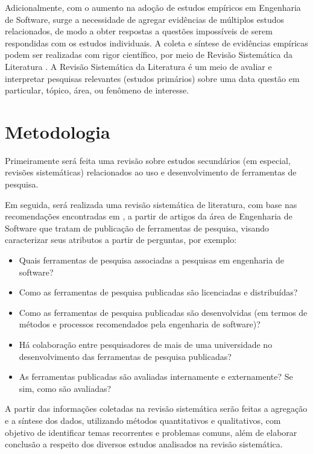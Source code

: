 \documentclass[12pt]{article}
\begin{document}
Adicionalmente, com o aumento na adoção de estudos empíricos em Engenharia de
Software, surge a necessidade de agregar evidências de múltiplos estudos
relacionados, de modo a obter respostas a questões impossíveis de serem
respondidas com os estudos individuais. A coleta e síntese de evidências
empíricas podem ser realizadas com rigor científico, por meio de Revisão
Sistemática da Literatura \cite{Kitchenham2007}. A Revisão Sistemática da
Literatura  é um meio de avaliar e interpretar pesquisas relevantes (estudos
primários) sobre uma data questão em particular, tópico, área, ou fenômeno de
interesse.

\section{Metodologia}

Primeiramente será feita uma revisão sobre estudos secundários (em especial,
revisões sistemáticas) relacionados ao uso e desenvolvimento de ferramentas de
pesquisa.
  
Em seguida, será realizada uma revisão sistemática de literatura, com base nas
recomendações encontradas em \cite{Kitchenham2007}, a partir
de artigos da área de Engenharia de Software que tratam de publicação de
ferramentas de pesquisa, visando caracterizar seus atributos a partir de
perguntas, por exemplo:

\begin{itemize}
  \item Quais ferramentas de pesquisa associadas a pesquisas em engenharia de
    software?
  \item Como as ferramentas de pesquisa publicadas são licenciadas e
    distribuídas?
  \item Como as ferramentas de pesquisa publicadas são desenvolvidas (em
    termos de métodos e processos recomendados pela engenharia de software)?
  \item Há colaboração entre pesquisadores de mais de uma universidade no
    desenvolvimento das ferramentas de pesquisa publicadas?
  \item As ferramentas publicadas são avaliadas internamente e externamente?
    Se sim, como são avaliadas?
\end{itemize}

A partir das informações coletadas na revisão sistemática serão feitas a
agregação e a síntese dos dados, utilizando métodos quantitativos e
qualitativos, com objetivo de identificar temas recorrentes e problemas
comuns, além de elaborar conclusão a respeito dos diversos estudos analisados
na revisão sistemática.
\end{document}
